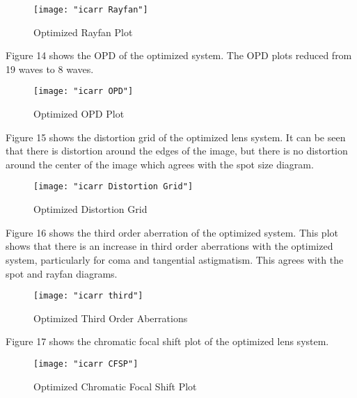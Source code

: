 \documentclass{article}
\begin{document}
\begin{figure}[H]
	\texttt{[image: "icarr Rayfan"]}
	\centering
	\caption{Optimized Rayfan Plot}
	\centering
\end{figure}

\newpage

Figure 14 shows the OPD of the optimized system. The OPD plots reduced from 19 waves to 8 waves.\\

\begin{figure}[H]
	\texttt{[image: "icarr OPD"]}
	\centering
	\caption{Optimized OPD Plot}
	\centering
\end{figure}

\newpage

Figure 15 shows the distortion grid of the optimized lens system. It can be seen that there is distortion around the edges of the image, but there is no distortion around the center of the image which agrees with the spot size diagram.\\

\begin{figure}[H]
	\texttt{[image: "icarr Distortion Grid"]}
	\centering
	\caption{Optimized Distortion Grid}
	\centering
\end{figure}

\newpage

Figure 16 shows the third order aberration of the optimized system. This plot shows that there is an increase in third order aberrations with the optimized system, particularly for coma and tangential astigmatism. This agrees with the spot and rayfan diagrams.\\

\begin{figure}[H]
	\texttt{[image: "icarr third"]}
	\centering
	\caption{Optimized Third Order Aberrations}
	\centering
\end{figure}

\newpage

Figure 17 shows the chromatic focal shift plot of the optimized lens system.\\

\begin{figure}[H]
	\texttt{[image: "icarr CFSP"]}
	\centering
	\caption{Optimized Chromatic Focal Shift Plot}
	\centering
\end{figure}
\end{document}
